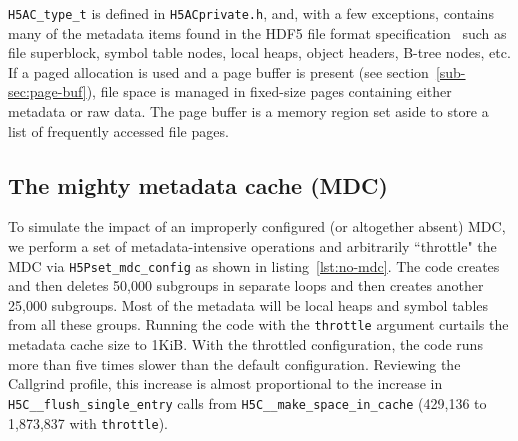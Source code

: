\texttt{H5AC\_type\_t} is defined in \texttt{H5ACprivate.h}, and, with a few exceptions, contains many of the metadata items found in the HDF5 file format specification~\cite{ffmt} such as file superblock, symbol table nodes, local heaps, object headers, B-tree nodes, etc. If a paged allocation is used and a page buffer is present (see section~\ref{sub-sec:page-buf}), file space is managed in fixed-size pages containing either metadata or raw data. The page buffer is a memory region set aside to store a list of frequently accessed file pages.

\subsection{The mighty metadata cache (MDC)}

To simulate the impact of an improperly configured (or altogether absent) MDC, we perform a set of metadata-intensive operations and arbitrarily ``throttle" the MDC via \texttt{H5Pset\_mdc\_config} as shown in listing~\ref{lst:no-mdc}. The code creates and then deletes 50,000 subgroups in separate loops and then creates another 25,000 subgroups. Most of the metadata will be local heaps and symbol tables from all these groups. Running the code with the \texttt{throttle} argument curtails the metadata cache size to 1KiB. With the throttled configuration, the code runs more than five times slower than the default configuration. Reviewing the Callgrind profile, this increase is almost proportional to the increase in \texttt{H5C\_\_flush\_single\_entry} calls from \texttt{H5C\_\_make\_space\_in\_cache} (429,136 to 1,873,837 with \texttt{throttle}).

